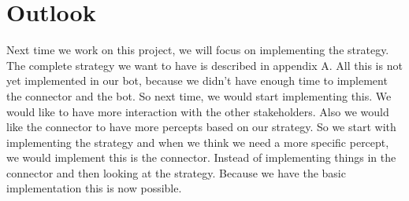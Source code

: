 \section{Outlook}
Next time we work on this project, we will focus on implementing the strategy. The complete strategy we want to have is described in appendix A. All this is not yet implemented in our bot, because we didn't have enough time to implement the connector and the bot. So next time, we would start implementing this. We would like to have more interaction with the other stakeholders. Also we would like the connector to have more percepts based on our strategy. So we start with implementing the strategy and when we think we need a more specific percept, we would implement this is the connector. Instead of implementing things in the connector and then looking at the strategy. Because we have the basic implementation this is now possible.

\newpage